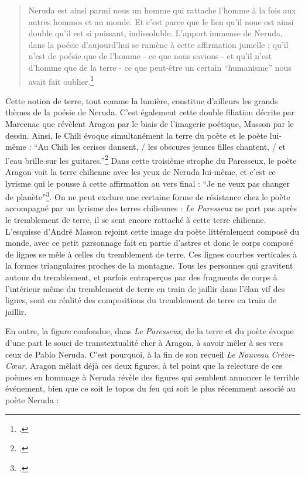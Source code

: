\begin{quote}
Neruda est ainsi parmi nous un homme qui rattache l’homme à la fois aux autres hommes et au monde. Et c’est parce que le lien qu’il noue est ainsi double qu’il est si puissant, indissoluble. L’apport immense de Neruda, dans la poésie d’aujourd’hui se ramène à cette affirmation jumelle : qu’il n’est de poésie que de l’homme - ce que nous savions - et qu’il n’est d’homme que de la terre - ce que peut-être un certain \enquote{humanisme} nous avait fait oublier.\footcite[p119]{pabloneruda}\end{quote}

Cette notion de terre, tout comme la lumière, constitue d’ailleurs les grands thèmes de la poésie de Neruda. C’est également cette double filiation décrite par Marcenac que révèlent Aragon par le biais de l’imagerie poétique, Masson par le dessin. Ainsi, le Chili évoque simultanément la terre du poète et le poète lui-même : \enquote{Au Chili les cerises dansent, / les obscures jeunes filles chantent, / et l'eau brille sur les guitares.}\footcite{pabloneruda} Dans cette troisième strophe du Paresseux, le poète Aragon voit la terre chilienne avec les yeux de Neruda lui-même, et c’est ce lyrisme qui le pousse à cette affirmation au vers final : \enquote{Je ne veux pas changer de planète}\footcite{pabloneruda}.  On ne peut exclure une certaine forme de résistance chez le poète accompagné par un lyrisme des terres chiliennes : \emph{Le Paresseux }ne part pas après le tremblement de terre, il se sent encore rattaché à cette terre chilienne. L’esquisse d’André Masson rejoint cette image du poète littéralement composé du monde, avec ce petit pzrsonnage fait en partie d’astres et donc le corps composé de lignes se mêle à celles du tremblement de terre. Ces lignes courbes verticales à la formes triangulaires proches de la montagne. Tous les personnes qui gravitent autour du tremblement, et parfois entraperçus par des fragments de corps à l’intérieur même du tremblement de terre en train de jaillir dans l’élan vif des lignes, sont en réalité des compositions du tremblement de terre en train de jaillir. 

	En outre, la figure confondue, dans \emph{Le Paresseux}, de la terre et du poète évoque d’une part le souci de transtextualité cher à Aragon, à savoir mêler à ses vers ceux de Pablo Neruda. C’est pourquoi, à la fin de son recueil \emph{Le Nouveau Crève-C\oe{}ur}, Aragon mêlait déjà ces deux figures, à tel point que la relecture de ces poèmes en hommage à Neruda révèle des figures qui semblent annoncer le terrible événement, bien que ce soit le topos du feu qui soit le plus récemment associé au poète Neruda : 

